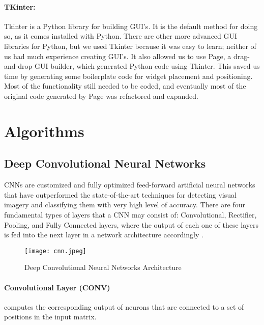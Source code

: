 \paragraph{TKinter:} Tkinter is a Python library for building GUI's.  It is the default method for doing so, as it comes installed with Python.  There are other more advanced GUI libraries for Python, but we used Tkinter because it was easy to learn; neither of us had much experience creating GUI's.  It also allowed us to use Page, a drag-and-drop GUI builder, which generated Python code using Tkinter.  This saved us time by generating some boilerplate code for widget placement and positioning.  Most of the functionality still needed to be coded, and eventually most of the original code generated by Page was refactored and expanded.  
\par


\pagebreak

\section{Algorithms}

\subsection{Deep Convolutional Neural Networks} CNNs are customized and fully optimized feed-forward artificial neural networks that have outperformed the state-of-the-art techniques for detecting visual imagery and classifying them with very high level of accuracy. There are four fundamental types of layers that a CNN may consist of: Convolutional, Rectifier, Pooling, and Fully Connected layers, where the output of each one of these layers is fed into the next layer in a network architecture accordingly \cite{standford-cnn}. 

\begin{figure}[!h]
	\centering
    \texttt{[image: cnn.jpeg]}
    \caption{Deep Convolutional Neural Networks Architecture}
\end{figure}

\paragraph{Convolutional Layer (CONV)} computes the corresponding output of neurons that are connected to a set of positions in the input matrix. 

